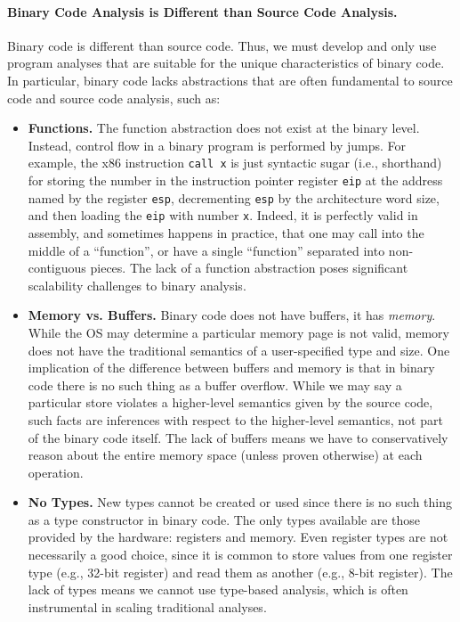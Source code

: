\paragraph{Binary Code Analysis is Different than Source Code Analysis.}
Binary code is different than source code. Thus, we must develop and
only use program analyses that are suitable for the unique
characteristics of binary code.  In particular, binary code lacks
abstractions that are often fundamental to source code and source code
analysis, such as:
\begin{itemize}
\item {\bf Functions.} The function abstraction does not exist at the
  binary level.  Instead, control flow in a binary program is
  performed by jumps. For example, the x86 instruction {\tt call x} is
  just syntactic sugar (i.e., shorthand) for storing the number in the
  instruction pointer register {\tt eip} at the address named by the
  register {\tt esp}, decrementing {\tt esp} by the architecture word
  size, and then loading the {\tt eip} with number {\tt x}. Indeed, it
  is perfectly valid in assembly, and sometimes happens in practice,
  that one may call into the middle of a ``function'', or have a
  single ``function'' separated into non-contiguous pieces. The lack
  of a function abstraction poses significant scalability challenges
  to binary analysis.

\item {\bf Memory vs. Buffers.} Binary code does not have buffers, it
  has \emph{memory}.  While the OS may determine a particular memory
  page is not valid, memory does not have the traditional semantics of
  a user-specified type and size. One implication of the difference
  between buffers and memory is that in binary code there is no such
  thing as a buffer overflow. While we may say a particular store
  violates a higher-level semantics given by the source code, such
  facts are inferences with respect to the higher-level semantics, not
  part of the binary code itself. The lack of buffers means we have to
  conservatively reason about the entire memory space (unless proven
  otherwise) at each operation.

\item {\bf No Types.} New types cannot be created or used since there
  is no such thing as a type constructor in binary code. The only
  types available are those provided by the hardware: registers and
  memory.  Even register types are not necessarily a good choice,
  since it is common to store values from one register type (e.g.,
  32-bit register) and read them as another (e.g., 8-bit
  register). The lack of types means we cannot use type-based
  analysis, which is often instrumental in scaling traditional
  analyses.

\end{itemize}


